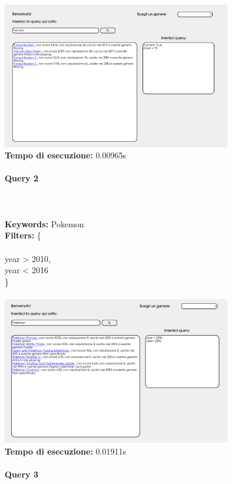 \documentclass[12pt]{article}
\begin{document}
\noindent \includegraphics[width=100mm]{Immagini/Image1.png} \\
\textbf{Tempo di esecuzione:} 0.00965s \\
\pagebreak

\paragraph{\LARGE{Query 2}} ~ \\ \\

\noindent \textbf{Keywords: } Pokemon \\
\textbf{Filters: } \{ \\ \\
\indent year > 2010, \\
\indent year < 2016 \\
\} \\\\

\noindent \includegraphics[width=100mm]{Immagini/Image2.png} \\
\textbf{Tempo di esecuzione:} 0.01911s \\
\pagebreak

\paragraph{\LARGE{Query 3}} ~ \\ \\
\end{document}
